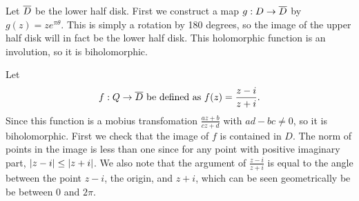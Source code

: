 \documentclass{homework}
\begin{document}
                                                                                            \begin{solution}
                                                                                            Let $\overline{D}$ be the lower half disk. First we construct a map $g: D\to\overline{D}$ by $g(z)=ze^{\pi\theta}$. This is simply a rotation by 180 degrees, so the image of the upper half disk will in fact be the lower half disk. This holomorphic function is an involution, so it is biholomorphic.

                                                                                            Let 
                                                                                            \[
                                                                                            f : Q \to \overline{D} \text{ be defined as } f(z) = \frac{z - i}{z + i}.
                                                                                            \]
                                                                                            Since this function is a mobius transfomation $\frac{az+b}{cz+d}$ with $ad-bc\neq 0$, so it is biholomorphic.
                                                                                            First we check that the image of $f$ is contained in $D$. The norm of points in the image is less than one since for any point with positive imaginary part, $\left|z-i\right|\leq \left|z + i\right|$. We also note that the argument of $\frac{z-i}{z+i}$ is equal to the angle between the point $z-i$, the origin, and $z+i$, which can be seen geometrically be be between 0 and $2\pi$.


\end{solution}
\end{document}
